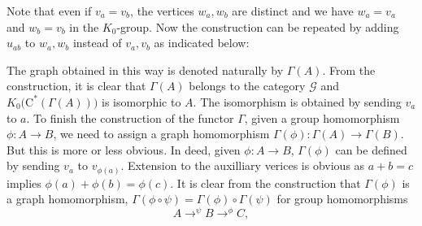 \documentclass[a4paper,11pt,reqno]{amsart}
\newcommand {\edge}[2] {\draw [->] (#1) -- ($ (#1) ! .5 ! (#2) $); \draw[] ($ (#1) ! .5 ! (#2) $) -- (#2); }
\newcommand {\labelpoint} [4] {\filldraw [fill = white] (#1) node[xshift = #2pt, yshift = #3pt] {$#4$} circle (1.5pt);}
\theoremstyle{plain}
\theoremstyle{named}
\numberwithin{equation}{section}
\begin{document}
                            Note that even if $v_{a}=v_{b}$, the vertices $w_{a}, w_{b}$ are distinct and we have $w_{a}=v_{a}$ and $w_{b}=v_{b}$ in the $K_{0}$-group. Now the construction can be repeated by adding $u_{ab}$ to $w_{a}, w_{b}$ instead of $v_{a},v_{b}$ as indicated below:
                            \begin {center}
\end {center}
                            The graph obtained in this way is denoted naturally by $\Gamma(A)$. From the construction, it is clear that $\Gamma(A)$ belongs to the category $\mathcal{G}$ and $K_{0}\Big(\textrm{C}^{\ast}(\Gamma(A))\Big)$ is isomorphic to $A$. The isomorphism is obtained by sending $v_{a}$ to $a$. To finish the construction of the functor $\Gamma$, given a group homomorphism $\phi:A\rightarrow B$,  we need to assign a graph homomorphism $\Gamma(\phi):\Gamma(A)\rightarrow\Gamma(B)$. But this is more or less obvious. In deed, given $\phi:A\rightarrow B$, $\Gamma(\phi)$ can be defined by sending $v_{a}$ to $v_{\phi(a)}$. Extension to the auxilliary verices is obvious as $a+b=c$ implies $\phi(a)+\phi(b)=\phi(c)$. It is clear from the construction that $\Gamma(\phi)$ is a graph homomorphism, $\Gamma(\phi\circ\psi)=\Gamma(\phi)\circ\Gamma(\psi)$ for group homomorphisms
                            \begin{displaymath}
                                A\longrightarrow^{\psi} B\longrightarrow^{\phi} C,
                            \end{displaymath}
\end{document}
